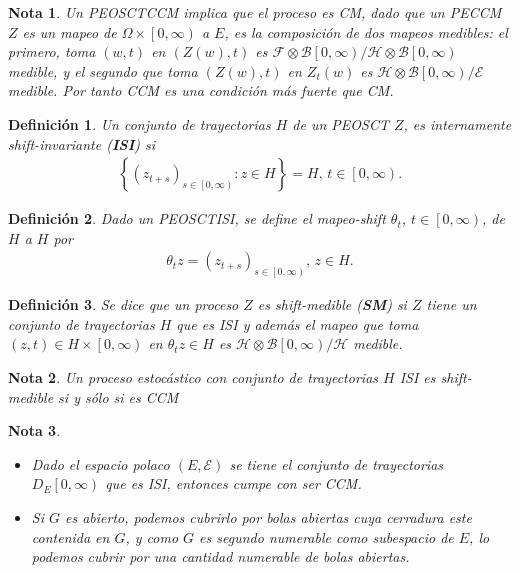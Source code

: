 \documentclass{article}
\newtheorem{Def}{Definición}
\newtheorem{Note}{Nota}
\begin{document}
\begin{Note}
Un PEOSCTCCM implica que el proceso es CM, dado que un PECCM $Z$ es un mapeo de $\Omega\times\left[0,\infty\right)$ a $E$, es la composici\'on de dos mapeos medibles: el primero, toma $\left(w,t\right)$ en $\left(Z\left(w\right),t\right)$ es $\mathcal{F}\otimes\mathcal{B}\left[0,\infty\right)/\mathcal{H}\otimes\mathcal{B}\left[0,\infty\right)$ medible, y el segundo que toma $\left(Z\left(w\right),t\right)$  en $Z_{t}\left(w\right)$ es $\mathcal{H}\otimes\mathcal{B}\left[0,\infty\right)/\mathcal{E}$ medible. Por tanto CCM es una condici\'on m\'as fuerte que CM.
\end{Note}

\begin{Def}
Un conjunto de trayectorias $H$ de un PEOSCT $Z$, es internamente shift-invariante (\textbf{ISI}) si 
\begin{eqnarray*}
\left\{\left(z_{t+s}\right)_{s\in\left[0,\infty\right)}:z\in H\right\}=H\textrm{, }t\in\left[0,\infty\right).
\end{eqnarray*}
\end{Def}


\begin{Def}
Dado un PEOSCTISI, se define el mapeo-shift $\theta_{t}$, $t\in\left[0,\infty\right)$, de $H$ a $H$ por 
\begin{eqnarray*}
\theta_{t}z=\left(z_{t+s}\right)_{s\in\left[0,\infty\right)}\textrm{, }z\in H.
\end{eqnarray*}
\end{Def}

\begin{Def}
Se dice que un proceso $Z$ es shift-medible (\textbf{SM}) si $Z$ tiene un conjunto de trayectorias $H$ que es ISI y adem\'as el mapeo que toma $\left(z,t\right)\in H\times\left[0,\infty\right)$ en $\theta_{t}z\in H$ es $\mathcal{H}\otimes\mathcal{B}\left[0,\infty\right)/\mathcal{H}$ medible.
\end{Def}

\begin{Note}
Un proceso estoc\'astico con conjunto de trayectorias $H$ ISI es shift-medible si y s\'olo si es CCM
\end{Note}

\begin{Note}
\begin{itemize}
\item Dado el espacio polaco $\left(E,\mathcal{E}\right)$ se tiene el  conjunto de trayectorias $D_{E}\left[0,\infty\right)$ que es ISI, entonces cumpe con ser CCM.

\item Si $G$ es abierto, podemos cubrirlo por bolas abiertas cuya cerradura este contenida en $G$, y como $G$ es segundo numerable como subespacio de $E$, lo podemos cubrir por una cantidad numerable de bolas abiertas.

\end{itemize}
\end{Note}
\end{document}
